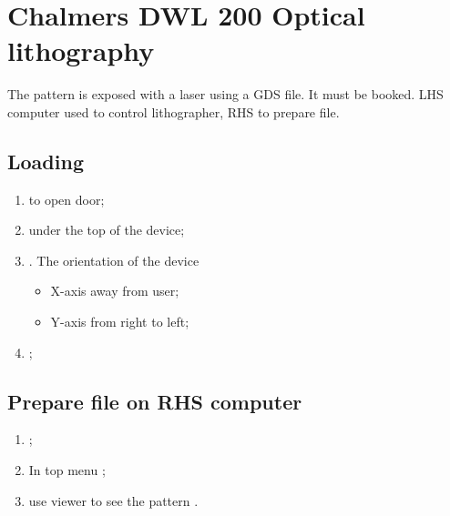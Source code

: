 
\section{Chalmers DWL 200 Optical lithography\label{sec:DWL200}}
The pattern is exposed with  a laser using a GDS file. It must  be booked.  {LHS computer used
  to control lithographer}, RHS to prepare file.
  
\subsection{Loading}

\begin{enumerate}
\item {} to open door;
\item {} under the top of the device;
\item {}. The orientation of the device
  \begin{itemize}
  \item X-axis away from user;
  \item Y-axis from right to left;
  \end{itemize}
\item {};
\end{enumerate}
 
\subsection{Prepare file on RHS computer}
\begin{enumerate}
\item {} \ira {} \ira {} \ira {};
\item In top menu \ira {} \ira {};
\item {}\ira use viewer to  see the pattern \ira {}.
\end{enumerate}
 
 
